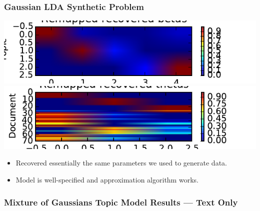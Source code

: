 \documentclass{beamer}
\begin{document}
\begin{frame}
  \frametitle{Gaussian LDA Synthetic Problem}
  \begin{center}
    \includegraphics[height=0.2\textheight]{assets/remapped_recovered_betas.pdf}\\
    \includegraphics[height=0.2\textheight]{assets/remapped_recovered_thetas.pdf}
  \end{center}
  \begin{itemize}
    \item Recovered essentially the same parameters we used to generate data.
    \item Model is well-specified and approximation algorithm works.
  \end{itemize}
\end{frame}

\begin{frame}
  \frametitle{Mixture of Gaussians Topic Model Results --- Text Only}
\end{frame}
\end{document}
